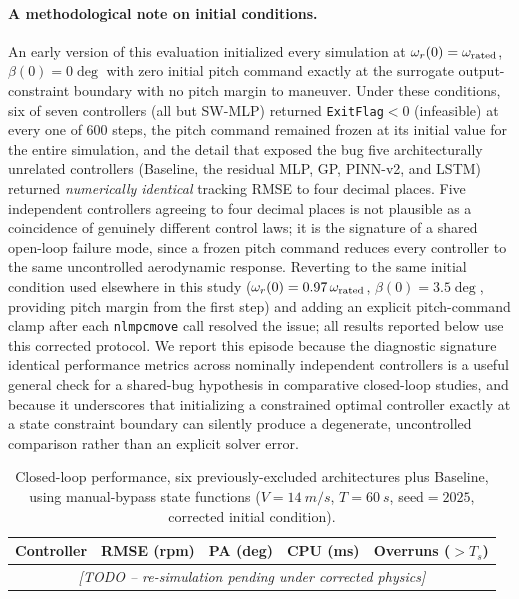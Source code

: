 \paragraph{A methodological note on initial conditions.} An early
version of this evaluation initialized every simulation at
$\omega_r(0)=\omega_{\text{rated}}$, $\beta(0)=0\deg$ with zero initial pitch
command  exactly at the surrogate output-constraint boundary with no
pitch margin to maneuver. Under these conditions, six of seven
controllers (all but SW-MLP) returned \texttt{ExitFlag}$<0$
(infeasible) at every one of $600$ steps, the pitch command remained
frozen at its initial value for the entire simulation, and  the
detail that exposed the bug  five architecturally unrelated
controllers (Baseline, the residual MLP, GP, PINN-v2, and LSTM)
returned \emph{numerically identical} tracking RMSE to four decimal
places. Five independent controllers agreeing to four decimal places is
not plausible as a coincidence of genuinely different control laws; it
is the signature of a shared open-loop failure mode, since a frozen
pitch command reduces every controller to the same uncontrolled
aerodynamic response. Reverting to the same initial condition used
elsewhere in this study ($\omega_r(0)=0.97\,\omega_{\text{rated}}$,
$\beta(0)=3.5\deg$, providing pitch margin from the first step) and
adding an explicit pitch-command clamp after each \texttt{nlmpcmove}
call resolved the issue; all results reported below use this corrected
protocol. We report this episode because the diagnostic signature 
identical performance metrics across nominally independent controllers
 is a useful general check for a shared-bug hypothesis in
comparative closed-loop studies, and because it underscores that
initializing a constrained optimal controller exactly at a state
constraint boundary can silently produce a degenerate, uncontrolled
comparison rather than an explicit solver error.

\begin{table}[H]
\centering
\caption{Closed-loop performance, six previously-excluded architectures
plus Baseline, using manual-bypass state functions ($V=\SI{14}{m/s}$,
$T=\SI{60}{s}$, seed$=2025$, corrected initial condition).}
\label{tab:bypass_closed_loop}
\begin{tabular}{lcccc}
\toprule
Controller & RMSE (rpm) & PA (deg) & CPU (ms) & Overruns ($>T_s$) \\
\midrule
\multicolumn{5}{c}{\emph{[TODO -- re-simulation pending under corrected physics]}} \\
\bottomrule
\end{tabular}
\end{table}

